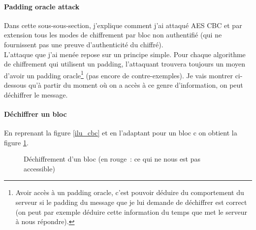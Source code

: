 \documentclass[a4paper, 12pt]{article}
\begin{document}
\paragraph{Padding oracle attack}\label{padoracle}
Dans cette sous-sous-section, j'explique comment j'ai attaqué AES CBC et par extension tous les modes de chiffrement par bloc non authentifié (qui ne fournissent pas une preuve d'authenticité du chiffré). \\ 

L'attaque que j'ai menée repose sur un principe simple. Pour chaque algorithme de chiffrement qui utilisent un padding, l'attaquant trouvera toujours un moyen d'avoir un padding oracle\footnote{Avoir accès à un padding oracle, c'est pouvoir déduire du comportement du serveur si le padding du message que je lui demande de déchiffrer est correct (on peut par exemple déduire cette information du temps que met le serveur à nous répondre).} (pas encore de contre-exemples).
Je vais montrer ci-dessous qu'à partir du moment où on a accès à ce genre d'information, on peut déchiffrer le message.

\paragraph{Déchiffrer un bloc}
\noindent En reprenant la figure \ref{ilu_cbc} et en l'adaptant pour un bloc c on obtient la figure \ref{cbcdec1bloc}. 

\begin{figure}[h]
\centering
{}
\caption{Déchiffrement d'un bloc (en rouge : ce qui ne nous est pas accessible)}
\label{cbcdec1bloc}
\end{figure}
\end{document}

